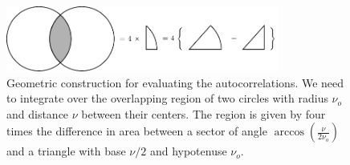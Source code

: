 \documentclass{osa-article}
\begin{document}
\begin{figure}[h]
 \centering
   \centering
   \includegraphics[width = 0.8\textwidth]{../figures/autocorrelation/autocorrelation.pdf}
   \caption{Geometric construction for evaluating the autocorrelations. We need
     to integrate over the overlapping region of two circles with radius $\nu_o$
     and distance $\nu$ between their centers. The region is given by four times
     the difference in area between a sector of angle
     $\arccos\left(\frac{\nu}{2\nu_o}\right)$ and a triangle with base $\nu/2$
     and hypotenuse $\nu_o$.}
   \label{fig:geometry}
 \end{figure}
\end{document}
